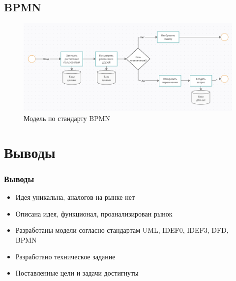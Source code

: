 \documentclass[aspectratio=169]{beamer}
\begin{document}
\subsection{BPMN}
\begin{frame}
    \begin{figure}
        \includegraphics[scale=.4]{img/BPMN.png}
        \caption{Модель по стандарту BPMN}
    \end{figure}
\end{frame}






\section{Выводы}
\begin{frame}
\frametitle{Выводы}

\begin{itemize}
    \item Идея уникальна, аналогов на рынке нет 
    \item Описана идея, функционал, проанализирован рынок
    \item Разработаны модели согласно стандартам UML, IDEF0, IDEF3, DFD, BPMN
    \item Разработано техническое задание 
    \item Поставленные цели и задачи достигнуты
\end{itemize}
\end{frame}


\begin{frame}[plain]
\end{frame}
\end{document}

